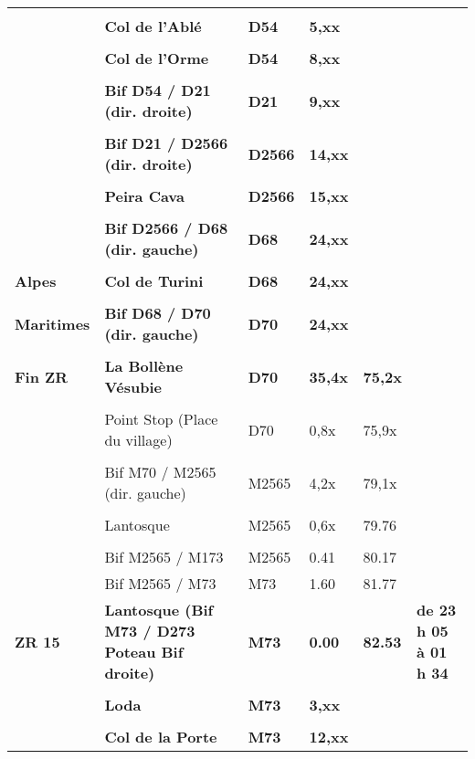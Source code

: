 \documentclass{article}%
\begin{document}
\begin{longtable}{p{2.25cm}|p{6.7cm}|p{2.0cm}|p{1.5cm}|p{1.5cm}|p{3.5cm}}
 & & & & & \\%
 &\textbf{Col de l'Ablé}&\textbf{D54}&\textbf{5,xx}& & \\%
 & & & & & \\%
 &\textbf{Col de l'Orme}&\textbf{D54}&\textbf{8,xx}& & \\%
 & & & & & \\%
 &\textbf{Bif D54 / D21 (dir. droite)}&\textbf{D21}&\textbf{9,xx}& & \\%
 & & & & & \\%
 &\textbf{Bif D21 / D2566 (dir. droite)}&\textbf{D2566}&\textbf{14,xx}& & \\%
 & & & & & \\%
 &\textbf{Peira Cava}&\textbf{D2566}&\textbf{15,xx}& & \\%
 & & & & & \\%
 &\textbf{Bif D2566 / D68 (dir. gauche)}&\textbf{D68}&\textbf{24,xx}& & \\%
 & & & & & \\%
\textbf{Alpes }&\textbf{Col de Turini}&\textbf{D68}&\textbf{24,xx}& & \\%
 & & & & & \\%
\textbf{Maritimes}&\textbf{Bif D68 / D70 (dir. gauche)}&\textbf{D70}&\textbf{24,xx}& & \\%
 & & & & & \\%
\textbf{Fin ZR}&\textbf{La Bollène Vésubie}&\textbf{D70}&\textbf{35,4x}&\textbf{75,2x}& \\%
 & & & & & \\%
 &Point Stop  (Place du village) &D70&0,8x&75,9x& \\%
 & & & & & \\%
 &Bif M70 / M2565 (dir. gauche)&M2565 &4,2x&79,1x& \\%
 & & & & & \\%
 &Lantosque&M2565&0,6x&79.76& \\%
 & & & & & \\%
 &Bif M2565 / M173&M2565&0.41&80.17& \\%
 &Bif M2565 / M73&M73&1.60&81.77& \\%
\textbf{ZR 15 }&\textbf{Lantosque (Bif M73 / D273 Poteau Bif droite)}&\textbf{M73}&\textbf{0.00}&\textbf{82.53}&\textbf{de 23 h 05 à 01 h 34}\\%
 & & & & & \\%
 &\textbf{Loda}&\textbf{M73}&\textbf{3,xx}& & \\%
 & & & & & \\%
 &\textbf{Col de la Porte}&\textbf{M73}&\textbf{12,xx}& & \\%

\end{longtable}
\end{document}
